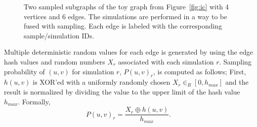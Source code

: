 \documentclass[10pt,journal,compsoc]{IEEEtran}
\begin{document}
\begin{figure}[!ht] 
    \centering
  \caption{
  \protect{} Two sampled subgraphs of the toy graph from Figure~\ref{fig:ic} with 4 vertices and 6 edges.
  \protect{} The simulations are performed in a way to be fused with sampling. Each edge is labeled with the corresponding sample/simulation IDs. 
  }
  \label{fig:traversal} 
\end{figure}


Multiple deterministic random values for each edge is generated by using the edge hash values and random numbers $X_r$ associated with each simulation $r$. 
Sampling probability of $(u, v)$ for simulation $r$, $P(u, v)_r$, is computed as follows; First, $h(u,v)$ is XOR'ed with a uniformly randomly chosen $X_r \in_R [0, h_{max}]$ and the result is normalized by dividing the value to the upper limit of the hash value $h_{max}$. Formally,
\begin{equation}
    \label{eq:hash_prob}
    P(u,v)_r = \frac{X_r \oplus h(u,v)}{h_{max}}.
\end{equation}
\end{document}
